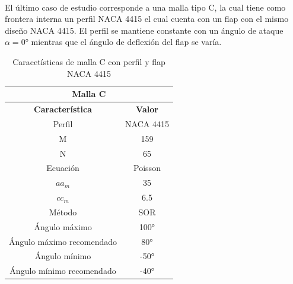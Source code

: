 \documentclass[letterpaper, openright, 12pt]{book}
\begin{document}
   \paragraph*{}
   El último caso de estudio corresponde a una malla tipo C, la cual tiene como
   frontera interna un perfil NACA 4415 el cual cuenta con un flap con el mismo
   diseño NACA 4415. El perfil se mantiene constante con un ángulo de ataque
   $\alpha = 0\si{\degree}$ mientras que el ángulo de deflexión del flap se
   varía.

    \begin{table}[htbp!]
    \begin{center}
        \begin{tabular}{| c | c |}
        \hline
        \multicolumn{2}{|c|}{Malla C}\\

        \hline
        \textbf{Característica} & \textbf{Valor} \\ \hline

        Perfil & NACA 4415
        \\ \hline

        M & 159
        \\ \hline

        N & 65
        \\ \hline

        Ecuación & Poisson
        \\\hline

        $aa_m$ & 35
        \\ \hline

        $cc_m$ & 6.5
        \\ \hline

        Método & SOR
        \\\hline

        Ángulo máximo & 100\si{\degree}
        \\ \hline

        Ángulo máximo recomendado & 80\si{\degree}
        \\ \hline

        Ángulo mínimo & -50\si{\degree}
        \\ \hline

        Ángulo mínimo recomendado & -40\si{\degree}
        \\ \hline
        \end{tabular}
        \caption{Caracetísticas de malla C con perfil y flap NACA 4415}
    \label{tabla_c_flap_naca_4415}
    \end{center}
    \end{table}
\end{document}
